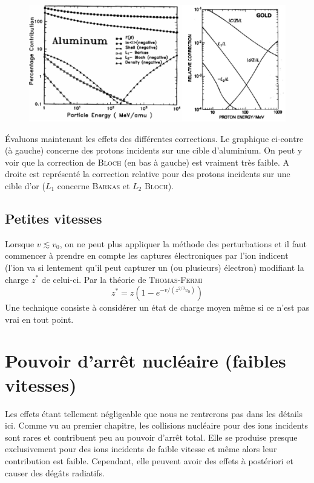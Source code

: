 \newpage
	\begin{figure}
	\includegraphics[scale=0.4]{ch2/image6.png}
	\end{figure}
Évaluons maintenant les effets des différentes corrections. Le graphique ci-contre (à gauche) 
concerne des protons incidents sur une cible d'aluminium. On peut y voir que la correction de
\textsc{Bloch} (en bas à gauche) est vraiment très faible. A droite est représenté la correction
relative pour des protons incidents sur une cible d'or ($L_1$ concerne \textsc{Barkas} et $L_2$
\textsc{Bloch}).


\subsection{Petites vitesses}
Lorsque $v \lesssim v_0$, on ne peut plus appliquer la méthode des perturbations et il faut 
commencer à prendre en compte les captures électroniques par l'ion indicent (l'ion va si
lentement qu'il peut capturer un (ou plusieurs) électron) modifiant la charge $z^*$ de 
celui-ci. Par la théorie de \textsc{Thomas-Fermi}
\begin{equation}
z^*=z\left(1-e^{-v/(z^{2/3}v_0)}\right)
\end{equation}
Une technique consiste à considérer un état de charge moyen même si ce n'est pas vrai en tout 
point.


\section{Pouvoir d'arrêt nucléaire (faibles vitesses)}
Les effets étant tellement négligeable que nous ne rentrerons pas dans les détails ici. Comme
vu au premier chapitre, les collisions nucléaire pour des ions incidents sont rares et contribuent
peu au pouvoir d'arrêt total. Elle se produise presque exclusivement pour des ions incidents de 
faible vitesse et même alors leur contribution est faible. Cependant, elle peuvent avoir des effets
à postériori et causer des dégâts radiatifs.\\

